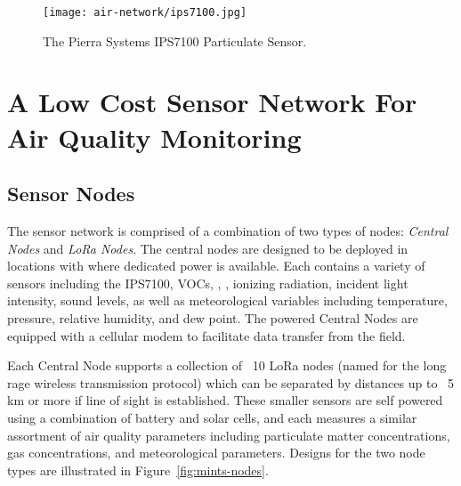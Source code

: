 \begin{figure}[!h]
  \vspace{-1cm}
  \centering
  \texttt{[image: air-network/ips7100.jpg]}
  \caption{The Pierra Systems IPS7100 Particulate Sensor.}
  \label{fig:ips7100}
\end{figure}

\section{A Low Cost Sensor Network For Air Quality Monitoring}



\subsection{Sensor Nodes}

The sensor network is comprised of a combination of two types of nodes:
\textit{Central Nodes} and \textit{LoRa Nodes}. The central nodes are designed
to be deployed in locations with where dedicated power is available. Each
contains a variety of sensors including the IPS7100, VOCs,
, , ionizing radiation, incident light intensity,
sound levels, as well as meteorological variables including temperature,
pressure, relative humidity, and dew point. The powered Central Nodes are
equipped with a cellular modem to facilitate data transfer from the field.


Each Central Node supports a collection of ~10 LoRa nodes (named for the
long rage wireless transmission protocol) which can be separated by distances up
to ~5 km or more if line of sight is established. These smaller sensors are self
powered using a combination of battery and solar cells, and each measures a
similar assortment of air quality parameters including particulate matter
concentrations, gas concentrations, and meteorological parameters. Designs for
the two node types are illustrated in Figure~\ref{fig:mints-nodes}.

